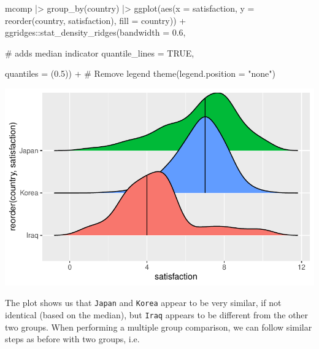 \documentclass[
  letterpaper,
  DIV=11,
  numbers=noendperiod]{scrreprt}
\newenvironment{Shaded}{\begin{snugshade}}{\end{snugshade}}
\newcommand{\AttributeTok}[1]{\textcolor[rgb]{0.40,0.45,0.13}{#1}}
\newcommand{\CommentTok}[1]{\textcolor[rgb]{0.37,0.37,0.37}{#1}}
\newcommand{\ConstantTok}[1]{\textcolor[rgb]{0.56,0.35,0.01}{#1}}
\newcommand{\FloatTok}[1]{\textcolor[rgb]{0.68,0.00,0.00}{#1}}
\newcommand{\FunctionTok}[1]{\textcolor[rgb]{0.28,0.35,0.67}{#1}}
\newcommand{\NormalTok}[1]{\textcolor[rgb]{0.00,0.23,0.31}{#1}}
\newcommand{\SpecialCharTok}[1]{\textcolor[rgb]{0.37,0.37,0.37}{#1}}
\newcommand{\StringTok}[1]{\textcolor[rgb]{0.13,0.47,0.30}{#1}}
\begin{document}
\begin{Shaded}
\begin{Highlighting}[]
\NormalTok{mcomp }\SpecialCharTok{|\textgreater{}}
  \FunctionTok{group\_by}\NormalTok{(country) }\SpecialCharTok{|\textgreater{}}
  \FunctionTok{ggplot}\NormalTok{(}\FunctionTok{aes}\NormalTok{(}\AttributeTok{x =}\NormalTok{ satisfaction,}
             \AttributeTok{y =} \FunctionTok{reorder}\NormalTok{(country, satisfaction),}
             \AttributeTok{fill =}\NormalTok{ country)) }\SpecialCharTok{+}
\NormalTok{  ggridges}\SpecialCharTok{::}\FunctionTok{stat\_density\_ridges}\NormalTok{(}\AttributeTok{bandwidth =} \FloatTok{0.6}\NormalTok{,}
                                
                                \CommentTok{\# adds median indicator}
                                \AttributeTok{quantile\_lines =} \ConstantTok{TRUE}\NormalTok{,}
                                
                                \AttributeTok{quantiles =}\NormalTok{ (}\FloatTok{0.5}\NormalTok{)) }\SpecialCharTok{+}
  \CommentTok{\# Remove legend}
  \FunctionTok{theme}\NormalTok{(}\AttributeTok{legend.position =} \StringTok{"none"}\NormalTok{)}
\end{Highlighting}
\end{Shaded}

\includegraphics{11_group_comparison_files/figure-pdf/multiple-unpaired-groups-plot-1.pdf}

The plot shows us that \texttt{Japan} and \texttt{Korea} appear to be
very similar, if not identical (based on the median), but \texttt{Iraq}
appears to be different from the other two groups. When performing a
multiple group comparison, we can follow similar steps as before with
two groups, i.e.
\end{document}
